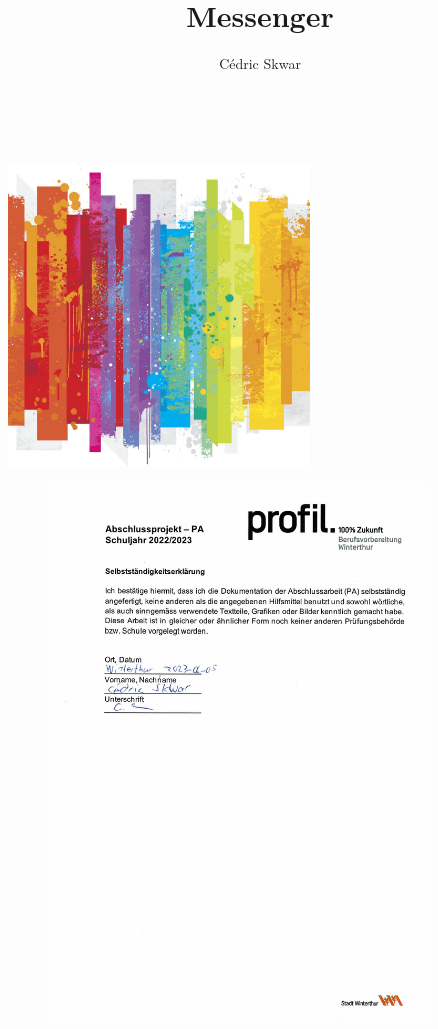 \documentclass[twoside,a4paper,11pt]{article}
\title{Messenger}
\author{Cédric Skwar}
\date{ }
\makeatletter
\renewcommand{\maketitle}{
    \begin{center}
        {\huge \bfseries \@title}\\[1ex]
        \vfill
        \begin{center}
            \includegraphics[width=0.6\textwidth]{my_picture.jpg}
        \end{center}
        \vfill
        {\large \@author}
    \end{center}
}
\makeatother
\begin{document}
\maketitle
\newpage
{} %
\begin{figure}[htbp]
  
  
  \includegraphics[width=0.9\textwidth]{txt/pictures/selbst.pdf}
  
\end{figure}
\restoregeometry
\newpage
\tableofcontents
\newpage

\newpage

\newpage

\newpage

\newpage

\newpage

\end{document}
